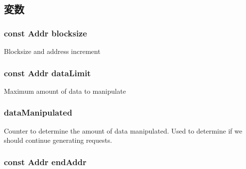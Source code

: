 \subsection{変数}
\hypertarget{classLinearGen_aebddb11d20f173e7a5ec2c9f2f591171}{
\subsubsection[{blocksize}]{\setlength{\rightskip}{0pt plus 5cm}const {\bf Addr} {\bf blocksize}}}
\label{classLinearGen_aebddb11d20f173e7a5ec2c9f2f591171}
Blocksize and address increment \hypertarget{classLinearGen_ad6ef2f2a9a6167b2d84c3246a2dd2e92}{
\subsubsection[{dataLimit}]{\setlength{\rightskip}{0pt plus 5cm}const {\bf Addr} {\bf dataLimit}}}
\label{classLinearGen_ad6ef2f2a9a6167b2d84c3246a2dd2e92}
Maximum amount of data to manipulate \hypertarget{classLinearGen_a708cc056d3a52d0f8f5a2cceffdc6d99}{
\subsubsection[{dataManipulated}]{ {\bf dataManipulated}}}
\label{classLinearGen_a708cc056d3a52d0f8f5a2cceffdc6d99}
Counter to determine the amount of data manipulated. Used to determine if we should continue generating requests. \hypertarget{classLinearGen_a1f198116a3da3ee4d73abf4760f70815}{
\subsubsection[{endAddr}]{\setlength{\rightskip}{0pt plus 5cm}const {\bf Addr} {\bf endAddr}}}
